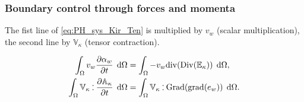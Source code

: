 \documentclass[preprint,12pt]{elsarticle}
\def\onedot{$\mathsurround0pt\ldotp$}
\def\cddot{%
	\mathbin{\vcenter{\baselineskip.67ex
			\hbox{\onedot}\hbox{\onedot}}%
}}
\begin{document}
	\subsubsection{Boundary control through forces and momenta}
	The fist line of \eqref{eq:PH_sys_Kir_Ten} is multiplied  by $v_w$ (scalar multiplication), the second line by $\mathbb{V}_{\kappa}$ (tensor contraction).
	
	\begin{align}
	\int_{\Omega} v_w \diffp{\alpha_w}{t} \,  \d\Omega &=  \int_{\Omega} -v_w \mathrm{div}(\mathrm{Div}(\mathbb{E}_{\kappa})) \, \d\Omega,  \label{eq:wf1_kir_ten}\\
	\int_{\Omega} \mathbb{V}_{\kappa} \cddot \diffp{\mathbb{A}_{\kappa}}{t} \,  \d\Omega &= \int_{\Omega} \mathbb{V}_{\kappa} \cddot  \mathrm{Grad}(\mathrm{grad}(e_w)) \,   \d\Omega.  \label{eq:wf2_kir_ten}
	\end{align}
	
\end{document}
